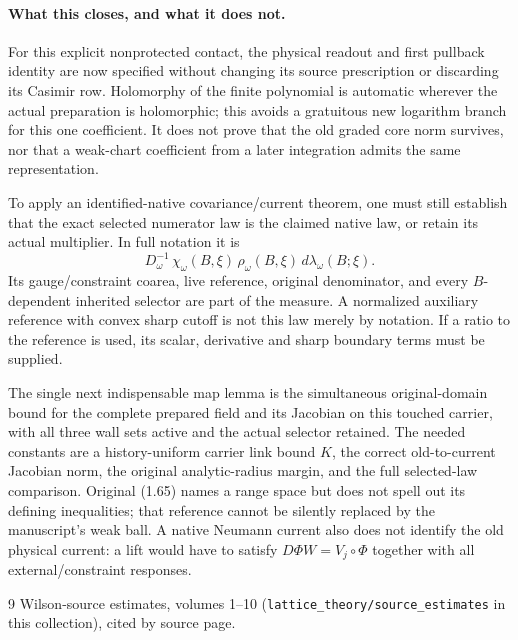 \documentclass{article}
\begin{document}
\paragraph{What this closes, and what it does not.}
For this explicit nonprotected contact, the physical readout and first pullback identity are now specified without changing its source prescription or discarding its Casimir row. Holomorphy of the finite polynomial is automatic wherever the actual preparation is holomorphic; this avoids a gratuitous new logarithm branch for this one coefficient. It does not prove that the old graded core norm survives, nor that a weak-chart coefficient from a later integration admits the same representation.

To apply an identified-native covariance/current theorem, one must still establish that the exact selected numerator law is the claimed native law, or retain its actual multiplier. In full notation it is
\[
 D_\omega^{-1}\,\chi_{\omega}(B,\xi)\,\rho_\omega(B,\xi)\,d\lambda_{\omega}(B;\xi).
\]
Its gauge/constraint coarea, live reference, original denominator, and every $B$-dependent inherited selector are part of the measure. A normalized auxiliary reference with convex sharp cutoff is not this law merely by notation. If a ratio to the reference is used, its scalar, derivative and sharp boundary terms must be supplied.

The single next indispensable map lemma is the simultaneous original-domain bound for the complete prepared field and its Jacobian on this touched carrier, with all three wall sets active and the actual selector retained. The needed constants are a history-uniform carrier link bound $K$, the correct old-to-current Jacobian norm, the original analytic-radius margin, and the full selected-law comparison. Original (1.65) names a range space but does not spell out its defining inequalities; that reference cannot be silently replaced by the manuscript's weak ball. A native Neumann current also does not identify the old physical current: a lift would have to satisfy $D\Phi W=V_j\circ\Phi$ together with all external/constraint responses.

\begin{thebibliography}{9}
 Wilson-source estimates, volumes 1--10 (\texttt{lattice\_theory/source\_estimates} in this collection), cited by source page.
\end{thebibliography}
\end{document}
